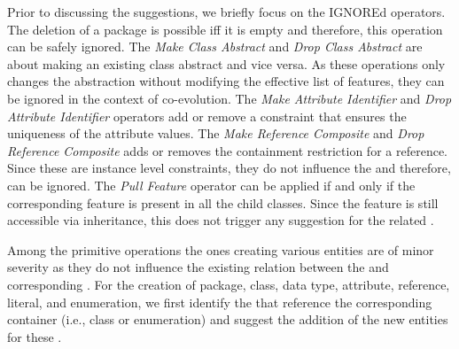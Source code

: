 Prior to discussing the suggestions, we briefly focus on the \textsf{IGNORE}d operators. The deletion of a package is possible iff it is empty and therefore, this operation can be safely ignored. The \textit{Make Class Abstract} and \textit{Drop Class Abstract} are about making an existing class abstract and vice versa.  As these operations only changes the abstraction without modifying the effective list of features, they can be ignored in the context of \viewtype co-evolution. The \textit{Make Attribute Identifier} and \textit{Drop Attribute Identifier} operators add or remove a constraint that ensures the uniqueness of the attribute values.  The \textit{Make Reference Composite} and \textit{Drop Reference Composite} adds or removes the containment restriction for a reference. Since these are instance level constraints, they do not influence the \viewtype and therefore, can be ignored. The \textit{Pull Feature}
operator can be applied if and only if the corresponding feature is present in all the child classes. Since the feature is still accessible via inheritance, this does not trigger any suggestion for the related \viewtypes.

Among the primitive operations the ones creating various entities are of minor severity as they do not influence the existing relation between the \metamodel and corresponding \viewtypes. For the creation of package, class, data type, attribute, reference, literal, and enumeration, we first identify the \viewtypes that reference the corresponding container (i.e., class or enumeration) and suggest the addition of the new entities for these \viewtypes.

